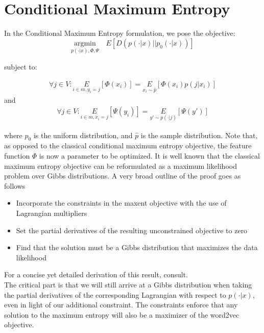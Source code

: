 \documentclass[]{article}
\begin{document}
\section{Conditional Maximum Entropy}

In the Conditional Maximum Entropy formulation, we pose the objective:\\

\begin{equation}\underset{p(\cdot | x), \Phi, \Psi}{\text{argmin}} \quad E\left[ D(p(\cdot|x) \vert \vert  p_0(\cdot|x))\right] \label{eq:maxent}
\end{equation}

\noindent subject to:

\begin{align}
	\forall j \in V: \underset{i \in m, y_i = j}{E}\left[\Phi(x_i)\right] = \underset{x_i \sim \hat{p}}{E}\left[\Phi(x_i) p(j|x_i)\right]
\end{align}
\noindent and
\begin{align}
	\forall j \in V: \underset{i \in m, x_i = j}{E}\left[\Psi(y_i)\right] = \underset{y\prime \sim p(\cdot|j)}{E}\left[\Psi(y\prime)\right]
\end{align}

\noindent where $p_0$ is the uniform distribution, and $\hat{p}$ is the sample distribution. Note that, as opposed to the classical conditional maximum entropy objective, the feature function $\Phi$ is now a parameter to be optimized. It is well known that the classical maximum entropy objective can be reformulated as a maximum likelihood problem over Gibbs distributions. A very broad outline of the proof goes as follows
\begin{itemize}
\item Incorporate the constraints in the maxent objective with the use of Lagrangian multipliers
\item Set the partial derivatives of the resulting unconstrained objective to zero
\item Find that the solution must be a Gibbs distribution that maximizes the data likelihood  
\end{itemize}
For a concise yet detailed derivation of this result, consult\cite{logregmaxent}.\\

The critical part is that we will still arrive at a Gibbs distribution when taking the partial derivatives of the corresponding Lagrangian with respect to $p(\cdot|x)$, even in light of our additional constraint. The constraints enforce that any solution to the maximum entropy will also be a maximizer of the word2vec objective.
\end{document}
